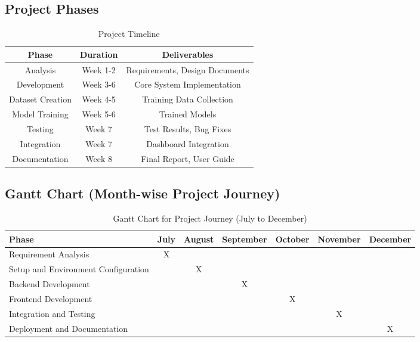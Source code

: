 \subsection{Project Phases}

\begin{table}[H]
\centering
\begin{tabular}{|c|c|c|}
\hline
\textbf{Phase} & \textbf{Duration} & \textbf{Deliverables} \\
\hline
Analysis & Week 1-2 & Requirements, Design Documents \\
\hline
Development & Week 3-6 & Core System Implementation \\
\hline
Dataset Creation & Week 4-5 & Training Data Collection \\
\hline
Model Training & Week 5-6 & Trained Models \\
\hline
Testing & Week 7 & Test Results, Bug Fixes \\
\hline
Integration & Week 7 & Dashboard Integration \\
\hline
Documentation & Week 8 & Final Report, User Guide \\
\hline
\end{tabular}
\caption{Project Timeline}
\end{table}

\subsection{Gantt Chart (Month-wise Project Journey)}

\begin{table}[H]
\centering
\small
\begin{tabular}{|p{4.2cm}|c|c|c|c|c|c|}
\hline
\textbf{Phase} & \textbf{July} & \textbf{August} & \textbf{September} & \textbf{October} & \textbf{November} & \textbf{December} \\
\hline
Requirement Analysis & X &  &  &  &  &  \\
\hline
Setup and Environment Configuration &  & X &  &  &  &  \\
\hline
Backend Development &  &  & X &  &  &  \\
\hline
Frontend Development &  &  &  & X &  &  \\
\hline
Integration and Testing &  &  &  &  & X &  \\
\hline
Deployment and Documentation &  &  &  &  &  & X \\
\hline
\end{tabular}
\caption{Gantt Chart for Project Journey (July to December)}
\end{table}

